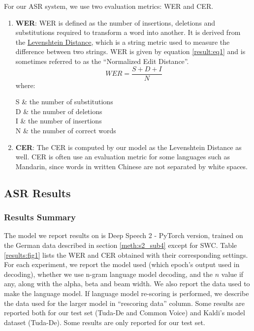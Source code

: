For our \ac{ASR} system, we use two evaluation metrics: \ac{WER} and \ac{CER}.
\begin{enumerate}
	\item \textbf{\acf{WER}}: \ac{WER} is defined as the number of insertions, deletions and substitutions required to transform a word into another. It is derived from the \href{https://en.wikipedia.org/wiki/Levenshtein_distance}{Levenshtein Distance}, which is a string metric used to measure the difference between two strings. \ac{WER} is given by equation \ref{result:eq1} and is sometimes referred to as the \enquote{Normalized Edit Distance}.
	\begin{equation}
	\label{result:eq1}
		WER = \frac{S+D+I}{N}
	\end{equation}
	where:
	\begin{conditions}
		S     &   the number of substitutions \\
		D     &   the number of deletions \\   
		I     &   the number of insertions \\
		N     &   the number of correct words \\
	\end{conditions}
	\item \textbf{\acf{CER}}: The \ac{CER} is computed by our model as the Levenshtein Distance as well. \ac{CER} is often use an evaluation metric for some languages such as Mandarin, since words in written Chinese are not separated by white spaces.
\end{enumerate}



\subsection{ASR Results}
\label{res:s1_sub2}


\subsubsection{Results Summary}
\label{res:s1_sub2_subsub1}

The model we report results on is Deep Speech 2 - PyTorch version, trained on the German data described in section \ref{meth:s2_sub4} except for \ac{SWC}.
Table \ref{results:fig1} lists the \ac{WER} and \ac{CER} obtained with their corresponding settings. For each experiment, we report the model used (which epoch's output used in decoding), whether we use n-gram language model decoding, and the $n$ value if any, along with the alpha, beta and beam width. We also report the data used to make the language model. If language model re-scoring is performed, we describe the data used for the larger model in \enquote{rescoring data} column. Some results are reported both for our test set (Tuda-De and Common Voice) and Kaldi's model dataset (Tuda-De). Some results are only reported for our test set. 

